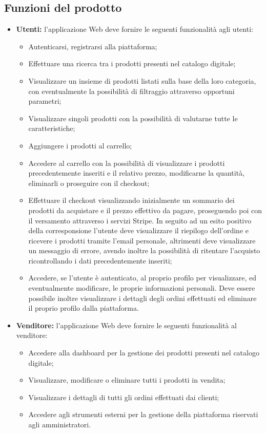 \subsection{Funzioni del prodotto}
\begin{itemize}
\item \textbf{Utenti:} l'applicazione Web deve fornire le seguenti funzionalità agli utenti:
	\begin{itemize}
	\item Autenticarsi, registrarsi alla piattaforma;
	\item Effettuare una ricerca tra i prodotti presenti nel catalogo digitale;
	\item Visualizzare un insieme di prodotti listati sulla base della loro categoria, con eventualmente la possibilità di filtraggio attraverso opportuni parametri;
	\item Visualizzare singoli prodotti con la possibilità di valutarne tutte le caratteristiche;
	\item Aggiungere i prodotti al carrello;
	\item Accedere al carrello con la possibilità di visualizzare i prodotti precedentemente inseriti e il relativo prezzo, modificarne la quantità, eliminarli o proseguire con il checkout;
	\item Effettuare il checkout visualizzando inizialmente un sommario dei prodotti da acquistare e il prezzo effettivo da pagare, proseguendo poi con il versamento attraverso i servizi Stripe. In seguito ad un esito positivo della corresponsione l'utente deve visualizzare il riepilogo dell'ordine e ricevere i prodotti tramite l'email personale, altrimenti deve visualizzare un messaggio di errore, avendo inoltre la possibilità di ritentare l'acquisto ricontrollando i dati precedentemente inseriti;
	\item Accedere, se l'utente è autenticato, al proprio profilo per visualizzare, ed eventualmente modificare, le proprie informazioni personali. Deve essere possibile inoltre visualizzare i dettagli degli ordini effettuati ed eliminare il proprio profilo dalla piattaforma.
	\end{itemize}
\item \textbf{Venditore:} l'applicazione Web deve fornire le seguenti funzionalità al venditore:
	\begin{itemize}
	\item Accedere alla dashboard per la gestione dei prodotti presenti nel catalogo digitale;
	\item Visualizzare, modificare o eliminare tutti i prodotti in vendita;
	\item Visualizzare i dettagli di tutti gli ordini effettuati dai clienti;
	\item Accedere agli strumenti esterni per la gestione della piattaforma riservati agli amministratori.
	\end{itemize}
\end{itemize}
